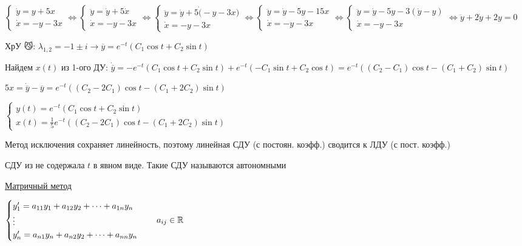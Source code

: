 \documentclass[12pt]{article}
\begin{document}
    \Ex
    $\begin{cases}
        \dot y = y + 5x \\
        \dot x = -y - 3x
    \end{cases} \Longleftrightarrow
    \begin{cases}
        \ddot y = \dot y + 5\dot x \\
        \dot x = -y - 3x
    \end{cases} \Longleftrightarrow
    \begin{cases}
        \ddot y = \dot y + 5\dot (-y - 3x) \\
        \dot x = -y - 3x
    \end{cases} \Longleftrightarrow
    \begin{cases}
        \ddot y = \dot y - 5y - 15x \\
        \dot x = -y - 3x
    \end{cases} \Longleftrightarrow
    \begin{cases}
        \ddot y = \dot y - 5y - 3(\dot y - y) \\
        \dot x = -y - 3x
    \end{cases} \Longleftrightarrow \ddot y + 2\dot y + 2y = 0$

    ХрУ 😼: $\lambda_{1,2} = -1 \pm i \rightarrow \overline{y} = e^{-t} (C_1 \cos t + C_2 \sin t)$

    Найдем $x(t)$ из 1-ого ДУ: $\dot{\overline{y}} = -e^{-t} (C_1 \cos t + C_2 \sin t) + e^{-t} (-C_1 \sin t + C_2 \cos t) = e^{-t} ((C_2 - C_1) \cos t - (C_1 + C_2) \sin t)$

    $5x = \dot{\overline{y}} - \overline{y} = e^{-t} ((C_2 - 2C_1) \cos t - (C_1 + 2C_2) \sin t)$

    $\begin{cases}
         y(t) = e^{-t} (C_1 \cos t + C_2 \sin t) \\
         x(t) = \frac{1}{5} e^{-t} ((C_2 - 2C_1) \cos t - (C_1 + 2C_2) \sin t)
    \end{cases}$

    \Nota Метод исключения сохраняет линейность, поэтому линейная СДУ (с постоян. коэфф.) сводится к ЛДУ (с пост. коэфф.)

    \Nota СДУ из \Exs не содержала $t$ в явном виде. Такие СДУ называются автономными

    \vspace{5mm}

    \underline{Матричный метод}

    $\begin{cases}
         y^{\prime}_1 = a_{11}y_1 + a_{12}y_2 + \dots + a_{1n} y_n \\
         \vdots \\
         y^{\prime}_n = a_{n1}y_n + a_{n2}y_2 + \dots + a_{nn} y_n
    \end{cases} \quad a_{ij} \in \mathbb{R}$
\end{document}
